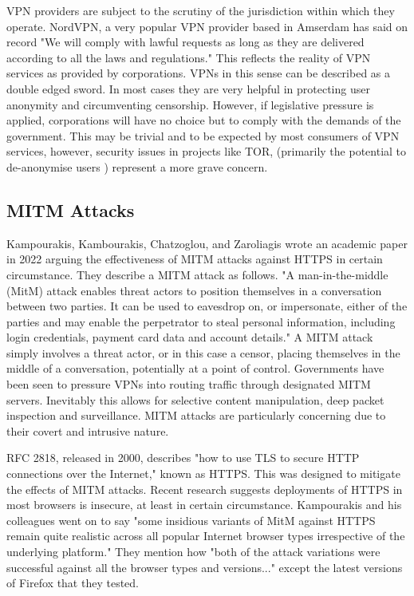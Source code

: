 VPN providers are subject to the scrutiny of the jurisdiction within which they operate. NordVPN, a very popular VPN provider based in Amserdam has said on record "We will comply with lawful requests as long as they are delivered according to all the laws and regulations." \cite{nordvpnPrivacy2024} This reflects the reality of VPN services as provided by corporations. VPNs in this sense can be described as a double edged sword. In most cases they are very helpful in protecting user anonymity and circumventing censorship. However, if legislative pressure is applied, corporations will have no choice but to comply with the demands of the government. This may be trivial and to be expected by most consumers of VPN services, however, security issues in projects like TOR, (primarily the potential to de-anonymise users \cite{tor_not_secure}) represent a more grave concern. 

\subsection{MITM Attacks}
Kampourakis, Kambourakis, Chatzoglou, and Zaroliagis wrote an academic paper in 2022 arguing the effectiveness of MITM attacks against HTTPS in certain circumstance. They describe a MITM attack as follows. "A man-in-the-middle (MitM) attack enables threat actors to position themselves in a conversation between two parties. It can be used to eavesdrop on, or impersonate, either of the parties and may enable the perpetrator to steal personal information, including login credentials, payment card data and account details."\cite{MITMvHTTPS} A MITM attack simply involves a threat actor, or in this case a censor, placing themselves in the middle of a conversation, potentially at a point of control. Governments have been seen to pressure VPNs into routing traffic through designated MITM servers. Inevitably this allows for selective content manipulation, deep packet inspection and surveillance. MITM attacks are particularly concerning due to their covert and intrusive nature. 

RFC 2818, released in 2000, describes "how to use TLS to secure HTTP connections over the Internet," \cite{rfc2818}known as HTTPS. This was designed to mitigate the effects of MITM attacks. Recent research suggests deployments of HTTPS in most browsers is insecure, at least in certain circumstance. Kampourakis and his colleagues went on to say "some insidious variants of MitM against HTTPS remain quite realistic across all popular Internet browser types irrespective of the underlying platform." \cite{MITMvHTTPS} 
They mention how "both of the attack variations were successful against all the browser types and versions..." except the latest versions of Firefox that they tested.

